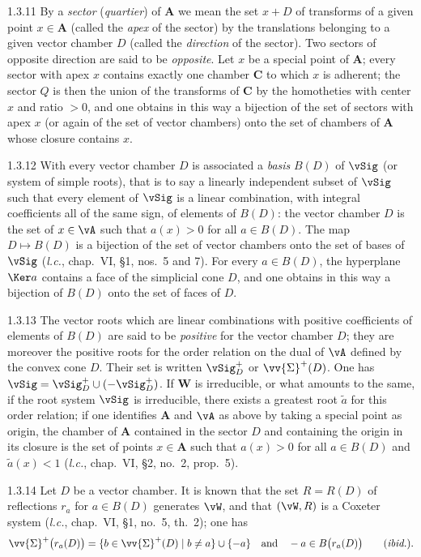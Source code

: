 \documentclass[12pt,a4paper,oneside,english]{smfart}
\makeatletter
\newcommand{\btanchor}[1]{\leavevmode\Hy@raisedlink{\hypertarget{bt:#1}{}}}
\theoremstyle{definition}
\theoremstyle{bt}
\makeatother
\begin{document}
\num{1.3.11}\btanchor{1.3.11} By a \emph{sector} (\emph{quartier}) of $\mathbf{A}$ we mean the
set $x+D$ of transforms of a given point $x\in\mathbf{A}$ (called the
\emph{apex} of the sector) by the translations belonging to a given vector
chamber $D$ (called the \emph{direction} of the sector). Two sectors of opposite direction are said to be \emph{opposite}. Let $x$ be a special point of $\mathbf{A}$; every sector with apex $x$ contains exactly one chamber $\mathbf{C}$ to which $x$ is adherent; the sector $Q$ is then the union of the transforms of $\mathbf{C}$ by the homotheties with center $x$ and ratio $>0$, and one obtains in this way a bijection of the set of sectors with apex $x$ (or again of the set of vector chambers) onto the set of chambers of $\mathbf{A}$ whose closure contains $x$.

\num{1.3.12}\btanchor{1.3.12} With every vector chamber $D$ is associated a \emph{basis} $B(D)$
of $\vSig$ (or system of simple roots), that is to say a linearly independent subset of $\vSig$ such that every element of $\vSig$ is a linear combination, with integral coefficients all of the same sign, of elements of $B(D)$: the vector chamber $D$ is the set of $x\in\vA$ such that $a(x)>0$ for all $a\in B(D)$. The map $D\mapsto B(D)$ is a bijection of the set of vector chambers onto the set of bases of $\vSig$ (\emph{l.c.}, chap.~VI, \S1, nos.~5 and 7). For every $a\in B(D)$, the hyperplane $\Ker a$ contains a face of the simplicial cone $D$, and one obtains in this way a bijection of $B(D)$ onto the set of faces of $D$.

\num{1.3.13}\btanchor{1.3.13} The vector roots which are linear combinations with positive
coefficients of elements of $B(D)$ are said to be \emph{positive} for the vector chamber $D$; they are moreover the positive roots for the order relation on the dual of $\vA$ defined by the convex cone $D$. Their set is written $\vSig^{+}_{D}$ or $\vv{\Sigma}^{+}(D)$. One has $\vSig=\vSig^{+}_{D}\cup(-\vSig^{+}_{D})$. If $\mathbf{W}$ is irreducible, or what amounts to the same, if the root system $\vSig$ is irreducible, there exists a greatest root $\tilde a$ for this order relation; if one identifies $\mathbf{A}$ and $\vA$ as above by taking a special point as origin, the chamber of $\mathbf{A}$ contained in the sector $D$ and containing the origin in its closure is the set of points $x\in\mathbf{A}$ such that $a(x)>0$ for all $a\in B(D)$ and $\tilde a(x)<1$ (\emph{l.c.}, chap.~VI, \S2, no.~2, prop.~5).

\num{1.3.14}\btanchor{1.3.14} Let $D$ be a vector chamber. It is known that the set
$R=R(D)$ of reflections $r_a$ for $a\in B(D)$ generates $\vW$, and that $(\vW,R)$ is a Coxeter system (\emph{l.c.}, chap.~VI, \S1, no.~5, th.~2); one has
\[
  \vv{\Sigma}^{+}\bigl(r_a(D)\bigr)
    =\{b\in\vv{\Sigma}^{+}(D)\mid b\neq a\}\cup\{-a\}
  \quad\text{and}\quad -a\in B\bigl(r_a(D)\bigr)
  \qquad(\textit{ibid.}).
\]
\end{document}
